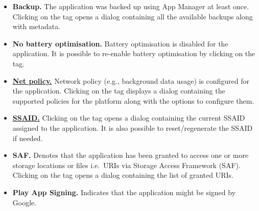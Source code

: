\begin{itemize}
    \item \textbf{Backup.} The application was backed up using App Manager at least once. Clicking on the tag
    opens a dialog containing all the available backups along with metadata.

    \item \textbf{No battery optimisation.} Battery optimisation is disabled for the application. It is possible to
    re-enable battery optimisation by clicking on the tag.

    \item \hyperref[sec:net-policy]{\textbf{Net policy.}} Network policy (e.g., background data usage) is configured
    for the application. Clicking on the tag displays a dialog containing the supported policies for the platform
    along with the options to configure them.

    \item \hyperref[sec:terminologies]{\textbf{SSAID.}} Clicking on the tag opens a dialog containing the current
    SSAID assigned to the application. It is also possible to reset/regenerate the SSAID if needed.

    \item \textbf{SAF.} Denotes that the application has been granted to access one or more storage locations or
    files i.e.\ URIs via Storage Access Framework (SAF). Clicking on the tag opens a dialog containing the list of
    granted URIs.

    \item \textbf{Play App Signing.} Indicates that the application might be signed by Google.
\end{itemize}

